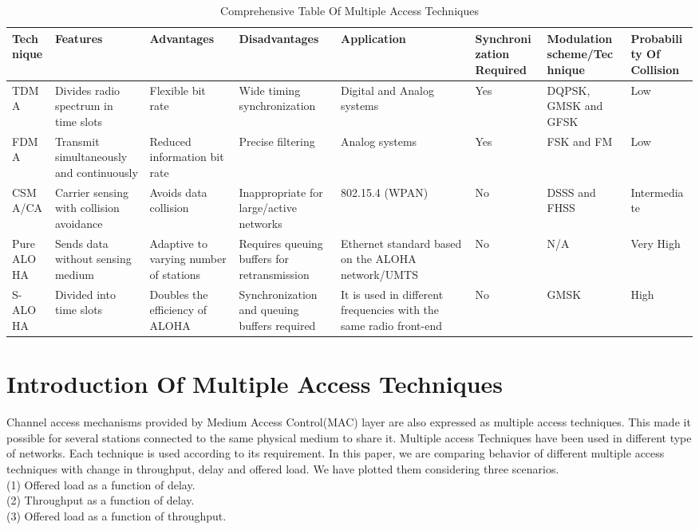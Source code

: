 \documentclass[11pt, conference, compsocconf, onecolumn]{IEEEtran}
\begin{document}
\begin{table*}
\caption{Comprehensive Table Of Multiple Access Techniques}
\begin{center}
    \begin{tabular}{| p{2cm} | p{2cm} | p{2cm} | p{2cm} | p{2cm} | p{1.7cm} | p{2cm}| p{1.5cm}|}
    \hline
    Technique & Features & Advantages & Disadvantages & Application & Synchronization Required & Modulation scheme/Technique & Probability Of Collision \\ \hline
    TDMA & Divides radio spectrum in time slots & Flexible bit rate &Wide timing synchronization &Digital and Analog systems  & Yes & DQPSK, GMSK and GFSK &Low \\ \hline
    FDMA & Transmit simultaneously and continuously  & Reduced information bit rate & Precise filtering & Analog systems & Yes & FSK and FM &Low\\ \hline
    CSMA/CA & Carrier sensing with collision avoidance & Avoids data collision  & Inappropriate for large/active networks & 802.15.4 (WPAN) & No & DSSS and FHSS & Intermediate\\ \hline
    Pure ALOHA & Sends data without sensing medium & Adaptive to varying number of stations & Requires queuing buffers for retransmission & Ethernet standard based on the ALOHA network/UMTS  & No & N/A &Very High\\ \hline
    S-ALOHA & Divided into time slots & Doubles the efficiency of ALOHA & Synchronization and queuing buffers required & It is used in different frequencies with the same radio front-end & No & GMSK &High\\ \hline
    \end{tabular}
\end{center}
\end{table*}

\section{Introduction Of Multiple Access Techniques}
Channel access mechanisms provided by Medium Access Control(MAC) layer are also expressed as multiple access techniques. This made it possible for several stations connected to the same
physical medium to share it. Multiple access Techniques have been used in different type of networks. Each technique is used according to its requirement.
In this paper, we are comparing behavior of different multiple access techniques with change in throughput, delay and offered load.
We have plotted them considering three scenarios.
\\
{(1)} Offered load as a function of delay.
\\
{(2)} Throughput as a function of delay.
\\
{(3)} Offered load as a function of throughput.
\end{document}
